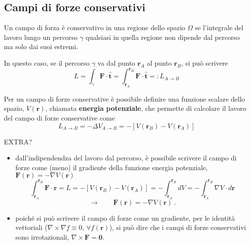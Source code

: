 \subsection{Campi di forze conservativi}
\begin{definition} Un campo di forza è conservativo in una regione dello spazio $\Omega$ se l'integrale del lavoro lungo un percorso $\gamma$ qualsiasi in quella regione non dipende dal percorso ma solo dai suoi estremi.
\end{definition}
In questo caso, se il percorso $\gamma$ va dal punto $\mathbf{r}_A$ al punto $\mathbf{r}_B$, si può scrivere
\begin{equation}
    L = \int_{\gamma} \mathbf{F} \cdot \mathbf{\hat{t}} = \int_{\mathbf{r}_A}^{\mathbf{r}_B} \mathbf{F} \cdot \mathbf{\hat{t}} =: L_{A \rightarrow B}
\end{equation}
\begin{definition} Per un campo di forze conservative è possibile definire una funzione scalare dello spazio, $V(\mathbf{r})$, chiamata \textbf{energia potenziale}, che permette di calcolare il lavoro del campo di forze conservative come
\begin{equation}
    L_{A \rightarrow B} = - \Delta V_{A \rightarrow B} = - \left[ V(\mathbf{r}_B) - V(\mathbf{r}_A) \right]
\end{equation}
\end{definition}

{\color{red} EXTRA?
\begin{itemize}
    \item dall'indipendendza del lavoro dal percorso, è possibile scrivere il campo di forze come (meno) il gradiente della funzione energia potenziale, $\mathbf{F}(\mathbf{r}) = - \nabla V(\mathbf{r})$
\begin{equation}
    \int_{\mathbf{r}_A}^{\mathbf{r}_B} \mathbf{F} \cdot \mathbf{r} = L = -\left[  V(\mathbf{r}_B) - V(\mathbf{r}_A) \right] = - \int_{\mathbf{r}_A}^{\mathbf{r}_B} dV = -\int_{\mathbf{r}_A}^{\mathbf{r}_B} \nabla V \cdot d \mathbf{r} 
\end{equation}
\begin{equation}
    \rightarrow \qquad \mathbf{F}(\mathbf{r}) = - \nabla V(\mathbf{r}) \ .
\end{equation}
    \item poiché si può scrivere il campo di forze come un gradiente, per le identità vettoriali ($\nabla \times \nabla f \equiv 0$, $\forall f(\mathbf{r})$), si può dire che i campi di forze conservativi sono irrotazionali, $\nabla \times \mathbf{F} = \mathbf{0}$.
\end{itemize}
}

